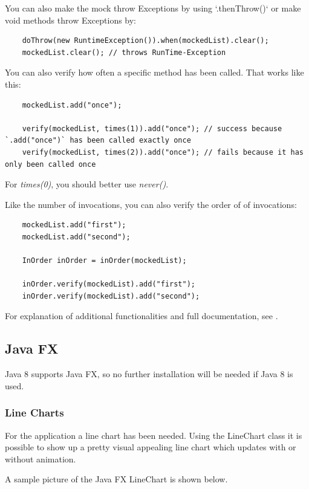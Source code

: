 \documentclass[11pt, a4paper]{article}
\begin{document}
You can also make the mock throw Exceptions by using `.thenThrow()` or make void methods throw Exceptions by:

\begin{lstlisting}
    doThrow(new RuntimeException()).when(mockedList).clear();
    mockedList.clear(); // throws RunTime-Exception
\end{lstlisting}

You can also verify how often a specific method has been called. That works like this:

\begin{lstlisting}
    mockedList.add("once");
    
    verify(mockedList, times(1)).add("once"); // success because `.add("once")` has been called exactly once
    verify(mockedList, times(2)).add("once"); // fails because it has only been called once
\end{lstlisting}

For \textit{times(0)}, you should better use \textit{never()}.
 
Like the number of invocations, you can also verify the order of of invocations:

\begin{lstlisting}
    mockedList.add("first");
    mockedList.add("second");
    
    InOrder inOrder = inOrder(mockedList);
    
    inOrder.verify(mockedList).add("first");
    inOrder.verify(mockedList).add("second");  
\end{lstlisting} 
    
For explanation of additional functionalities and full documentation, see \cite{MockitoDownload}.

\subsection{Java FX}
Java 8 supports Java FX, so no further installation will be needed if Java 8 is used. 

\subsubsection{Line Charts}

For the application a line chart has been needed. Using the LineChart class it is possible to show up a pretty visual appealing line chart which updates with or without animation.

A sample picture of the Java FX LineChart is shown below. 
\end{document}
